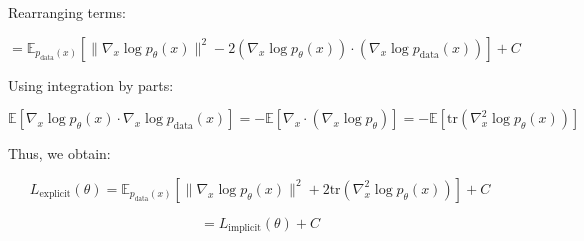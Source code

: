\documentclass{article}
\begin{document}
\begin{enumerate}
Rearranging terms:

\[
= \mathbb{E}_{p_{\text{data}}(x)}
\left[
\|\nabla_x \log p_{\theta}(x)\|^2 - 2 (\nabla_x \log p_{\theta}(x)) \cdot (\nabla_x \log p_{\text{data}}(x))
\right]
+ C
\]

Using integration by parts:

\[
\mathbb{E} \left[ \nabla_x \log p_{\theta}(x) \cdot \nabla_x \log p_{\text{data}}(x) \right] = -\mathbb{E} \left[ \nabla_x \cdot (\nabla_x \log p_{\theta}) \right] = -\mathbb{E} \left[ \text{tr}(\nabla_x^2 \log p_{\theta}(x)) \right]
\]

Thus, we obtain:

\[
L_{\text{explicit}}(\theta) = \mathbb{E}_{p_{\text{data}}(x)}
\left[
\|\nabla_x \log p_{\theta}(x)\|^2 + 2 \text{tr}(\nabla_x^2 \log p_{\theta}(x))
\right]
+ C
\]

\[
= L_{\text{implicit}}(\theta) + C
\]
\end{enumerate}
\end{document}
